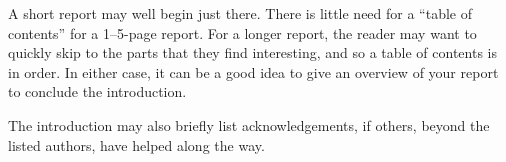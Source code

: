 \medskip

A short report may well begin just there. There is little need for a
``table of contents'' for a 1--5-page report. For a longer report, the
reader may want to quickly skip to the parts that they find
interesting, and so a table of contents is in order. In either case,
it can be a good idea to give an overview of your report to conclude
the introduction.

The introduction may also briefly list acknowledgements, if others,
beyond the listed authors, have helped along the way.
















